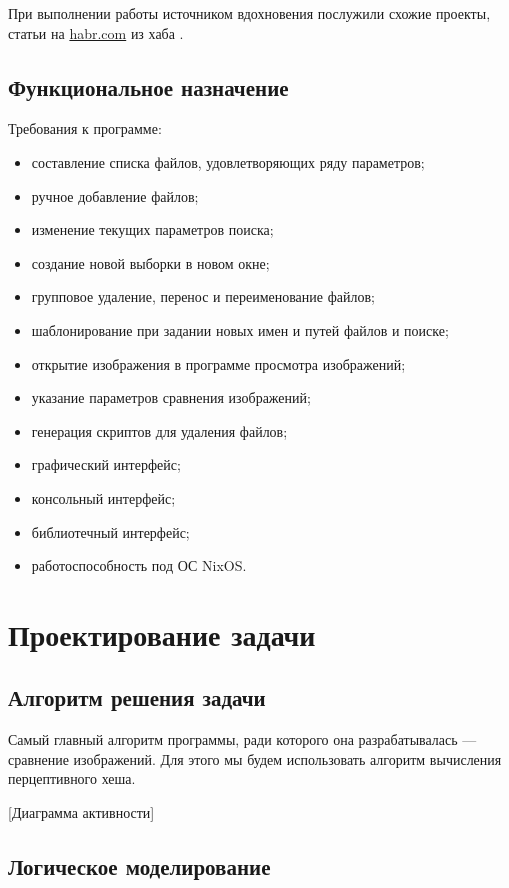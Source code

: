 \documentclass[variant=courcework]{bsuir}
\begin{document}
При выполнении работы источником вдохновения послужили схожие проекты, статьи на
\href{https://habr.com/}{habr.com} из хаба .

\section{Функциональное назначение}

Требования к программе:

\begin{itemize}
    \item составление списка файлов, удовлетворяющих ряду параметров;
    \item ручное добавление файлов;
    \item изменение текущих параметров поиска;
    \item создание новой выборки в новом окне;
    \item групповое удаление, перенос и переименование файлов;
    \item шаблонирование при задании новых имен и путей файлов и поиске;
    \item открытие изображения в программе просмотра изображений;
    \item указание параметров сравнения изображений;
    \item генерация скриптов для удаления файлов;
    \item графический интерфейс;
    \item консольный интерфейс;
    \item библиотечный интерфейс;
    \item работоспособность под ОС NixOS.
\end{itemize}

\chapter{Проектирование задачи}

\section{Алгоритм решения задачи}

Самый главный алгоритм программы, ради которого она разрабатывалась ---
сравнение изображений. Для этого мы будем использовать
алгоритм вычисления перцептивного хеша. 

[Диаграмма активности]

\section{Логическое моделирование}
\end{document}
